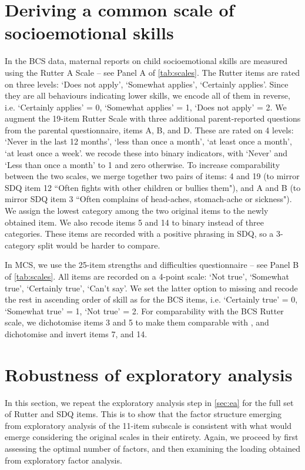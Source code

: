 
\section{Deriving a common scale of socioemotional skills}\label{asec:scales}

In the BCS data, maternal reports on child socioemotional skills are measured using the Rutter A Scale \citep{Rutter1970} -- see Panel A of \autoref{tab:scales}. The Rutter items are rated on three levels: `Does not apply', `Somewhat applies', `Certainly applies'. Since they are all behaviours indicating lower skills, we encode all of them in reverse, i.e. `Certainly applies' = 0, `Somewhat applies' = 1, `Does not apply' = 2. We augment the 19-item Rutter Scale with three additional parent-reported questions from the parental questionnaire, items A, B, and D. These are rated on 4 levels: `Never in the last 12 months', `less than once a month', `at least once a month', `at least once a week'. we recode these into binary indicators, with `Never' and `Less than once a month' to 1 and zero otherwise. To increase comparability between the two scales, we merge together two pairs of items: 4 and 19 (to mirror SDQ item 12 ``Often fights with other children or bullies them"), and A and B (to mirror SDQ item 3 ``Often complains of head-aches, stomach-ache or sickness"). We assign the lowest category among the two original items to the newly obtained item. We also recode items 5 and 14 to binary instead of three categories. These items are recorded with a positive phrasing in SDQ, so a 3-category split would be harder to compare.

In MCS, we use the 25-item strengths and difficulties questionnaire \citep{Goodman1997} -- see Panel B of \autoref{tab:scales}. All items are recorded on a 4-point scale: `Not true', `Somewhat true', `Certainly true', `Can't say'. We set the latter option to missing and recode the rest in ascending order of skill as for the BCS items, i.e. `Certainly true' = 0, `Somewhat true' = 1, `Not true' = 2. For comparability with the BCS Rutter scale, we dichotomise items 3 and 5 to make them comparable with , and dichotomise and invert items 7, and 14.

\section{Robustness of exploratory analysis}\label{asec:fullefa}

In this section, we repeat the exploratory analysis step in \autoref{sec:ea} for the full set of Rutter and SDQ items. This is to show that the factor structure emerging from exploratory analysis of the 11-item subscale is consistent with what would emerge considering the original scales in their entirety. Again, we proceed by first assessing the optimal number of factors, and then examining the loading obtained from exploratory factor analysis.

